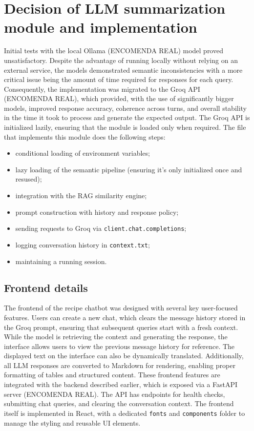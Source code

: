 \documentclass[conference]{IEEEtran}
\begin{document}
\section{Decision of LLM summarization module and implementation}


Initial tests with the local Ollama (ENCOMENDA REAL) model proved unsatisfactory. Despite the advantage of running locally without relying on an external service, the models demonstrated semantic inconsistencies with a more critical issue being the amount of time required for responses for each query. Consequently, the implementation was migrated to the Groq API (ENCOMENDA REAL), which provided, with the use of significantly bigger models, improved response accuracy, coherence across turns, and overall stability in the time it took to process and generate the expected output. The Groq API is initialized lazily, ensuring that the module is loaded only when required.
The file that implements this module does the following steps:
\begin{itemize}
    \item conditional loading of environment variables;
    \item lazy loading of the semantic pipeline (ensuring it's only initialized once and resused);
    \item integration with the RAG similarity engine;
    \item prompt construction with history and response policy;
    \item sending requests to Groq via \verb|client.chat.completions|;
    \item logging conversation history in \verb|context.txt|;
    \item maintaining a running session.
\end{itemize}




\subsection{Frontend details}



The frontend of the recipe chatbot was designed with several key user-focused features. Users can create a new chat, which clears the message history stored in the Groq prompt, ensuring that subsequent queries start with a fresh context. While the model is retrieving the context and generating the response, the interface allows users to view the previous message history for reference. The displayed text on the interface can also be dynamically translated. Additionally, all LLM responses are converted to Markdown for rendering, enabling proper formatting of tables and structured content. These frontend features are integrated with the backend described earlier, which is exposed via a FastAPI server (ENCOMENDA REAL). The API has endpoints for health checks, submitting chat queries, and clearing the conversation context. The frontend itself is implemented in React, with a dedicated \texttt{fonts} and \texttt{components} folder to manage the styling and reusable UI elements.
\end{document}
